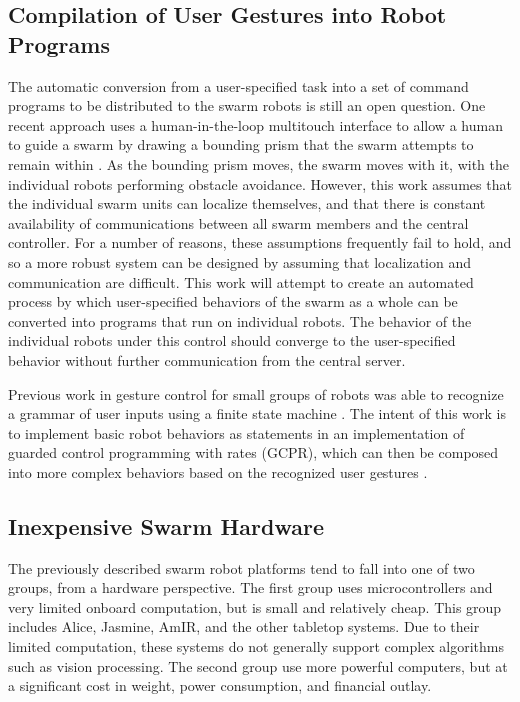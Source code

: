 \subsection{Compilation of User Gestures into Robot Programs}
The automatic conversion from a user-specified task into a set of command programs to be distributed to the swarm robots is still an open question.
One recent approach uses a human-in-the-loop multitouch interface to allow a human to guide a swarm by drawing a bounding prism that the swarm attempts to remain within \citep{ayanian2014controlling}. 
As the bounding prism moves, the swarm moves with it, with the individual robots performing obstacle avoidance. 
However, this work assumes that the individual swarm units can localize themselves, and that there is constant availability of communications between all swarm members and the central controller. 
For a number of reasons, these assumptions frequently fail to hold, and so a more robust system can be designed by assuming that localization and communication are difficult. 
This work will attempt to create an automated process by which user-specified behaviors of the swarm as a whole can be converted into programs that run on individual robots. 
The behavior of the individual robots under this control should converge to the user-specified behavior without further communication from the central server.

Previous work in gesture control for small groups of robots was able to recognize a grammar of user inputs using a finite state machine \citep{micire2010multi}.
The intent of this work is to implement basic robot behaviors as statements in an implementation of guarded control programming with rates (GCPR), which can then be composed into more complex behaviors based on the recognized user gestures \citep{napp2011compositional}.  


\subsection{Inexpensive Swarm Hardware}

The previously described swarm robot platforms tend to fall into one of two groups, from a hardware perspective. 
The first group uses microcontrollers and very limited onboard computation, but is small and relatively cheap.
This group includes Alice, Jasmine, AmIR, and the other tabletop systems. 
Due to their limited computation, these systems do not generally support complex algorithms such as vision processing. 
The second group use more powerful computers, but at a significant cost in weight, power consumption, and financial outlay.

